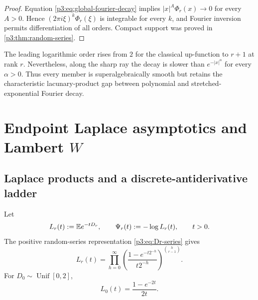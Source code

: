 \documentclass[11pt,oneside]{article}
\theoremstyle{definition}
\theoremstyle{remark}
\begin{document}
\begin{proof}
Equation \eqref{p3:eq:global-fourier-decay} implies $|x|^A\Phi_r(x)\to0$ for every $A>0$.  Hence $(2\pi i\xi)^k\Phi_r(\xi)$ is integrable for every $k$, and Fourier inversion permits differentiation of all orders.  Compact support was proved in \cref{p3:thm:random-series}.
\end{proof}

\begin{remark}
The leading logarithmic order rises from $2$ for the classical up-function to $r+1$ at rank $r$.  Nevertheless, along the sharp ray the decay is slower than $e^{-|x|^\alpha}$ for every $\alpha>0$.  Thus every member is superalgebraically smooth but retains the characteristic lacunary-product gap between polynomial and stretched-exponential Fourier decay.
\end{remark}

\section{Endpoint Laplace asymptotics and Lambert \texorpdfstring{$W$}{W}}\label{p3:sec:endpoint}

\subsection{Laplace products and a discrete-antiderivative ladder}

Let
\begin{equation}\label{p3:eq:Lr-Psir}
  L_r(t):=\mathbb E e^{-tD_r},
  \qquad
  \Psi_r(t):=-\log L_r(t),
  \qquad t>0.
\end{equation}
The positive random-series representation \eqref{p3:eq:Dr-series} gives
\begin{equation}\label{p3:eq:Lr-product}
 L_r(t)=\prod_{h=0}^{\infty}
 \left(\frac{1-e^{-t2^{-h}}}{t2^{-h}}\right)^{\binom h{r-1}}.
\end{equation}
For $D_0\sim\operatorname{Unif}[0,2]$,
\begin{equation}\label{p3:eq:L0}
  L_0(t)=\frac{1-e^{-2t}}{2t}.
\end{equation}
\end{document}
